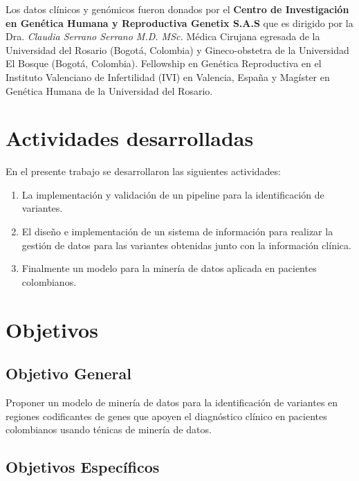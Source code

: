 Los datos clínicos y genómicos fueron donados por el \textbf{Centro de Investigación en Genética Humana y Reproductiva Genetix S.A.S} que es dirigido por la Dra. \textit{Claudia Serrano Serrano M.D. MSc.} Médica Cirujana egresada de la Universidad del Rosario (Bogotá, Colombia) y Gineco-obstetra de la Universidad El Bosque (Bogotá, Colombia). Fellowship en Genética Reproductiva en el Instituto Valenciano de Infertilidad (IVI) en Valencia, España y Magíster en Genética Humana de la Universidad del Rosario.

\section*{Actividades desarrolladas}

En el presente trabajo se desarrollaron las siguientes actividades:

\begin{enumerate}  
	\item La implementación y validación de un pipeline para la identificación de variantes.
	\item El diseño e implementación de un sistema de información para realizar la gestión de datos para las variantes obtenidas junto con la información clínica.
	\item Finalmente un modelo para la  minería de datos aplicada en pacientes colombianos.
\end{enumerate}
 
\section*{Objetivos}

\subsection*{Objetivo General}%

Proponer un modelo de miner\'ia de datos para la identificaci\'on de variantes en regiones codificantes de genes  que apoyen el  diagn\'ostico cl\'inico en pacientes colombianos usando t\'enicas de miner\'ia de datos.


\subsection*{Objetivos Espec\'ificos}

